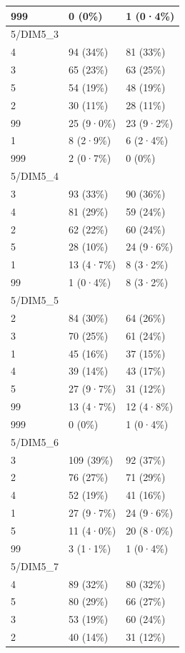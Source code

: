 \documentclass[
]{book}
\begin{document}
\begin{tabular}{l|l|l}
\hline
999 & 0 (0\%) & 1 (0·4\%)\\
\hline
5/DIM5\_3 &  & \\
\hline
4 & 94 (34\%) & 81 (33\%)\\
\hline
3 & 65 (23\%) & 63 (25\%)\\
\hline
5 & 54 (19\%) & 48 (19\%)\\
\hline
2 & 30 (11\%) & 28 (11\%)\\
\hline
99 & 25 (9·0\%) & 23 (9·2\%)\\
\hline
1 & 8 (2·9\%) & 6 (2·4\%)\\
\hline
999 & 2 (0·7\%) & 0 (0\%)\\
\hline
5/DIM5\_4 &  & \\
\hline
3 & 93 (33\%) & 90 (36\%)\\
\hline
4 & 81 (29\%) & 59 (24\%)\\
\hline
2 & 62 (22\%) & 60 (24\%)\\
\hline
5 & 28 (10\%) & 24 (9·6\%)\\
\hline
1 & 13 (4·7\%) & 8 (3·2\%)\\
\hline
99 & 1 (0·4\%) & 8 (3·2\%)\\
\hline
5/DIM5\_5 &  & \\
\hline
2 & 84 (30\%) & 64 (26\%)\\
\hline
3 & 70 (25\%) & 61 (24\%)\\
\hline
1 & 45 (16\%) & 37 (15\%)\\
\hline
4 & 39 (14\%) & 43 (17\%)\\
\hline
5 & 27 (9·7\%) & 31 (12\%)\\
\hline
99 & 13 (4·7\%) & 12 (4·8\%)\\
\hline
999 & 0 (0\%) & 1 (0·4\%)\\
\hline
5/DIM5\_6 &  & \\
\hline
3 & 109 (39\%) & 92 (37\%)\\
\hline
2 & 76 (27\%) & 71 (29\%)\\
\hline
4 & 52 (19\%) & 41 (16\%)\\
\hline
1 & 27 (9·7\%) & 24 (9·6\%)\\
\hline
5 & 11 (4·0\%) & 20 (8·0\%)\\
\hline
99 & 3 (1·1\%) & 1 (0·4\%)\\
\hline
5/DIM5\_7 &  & \\
\hline
4 & 89 (32\%) & 80 (32\%)\\
\hline
5 & 80 (29\%) & 66 (27\%)\\
\hline
3 & 53 (19\%) & 60 (24\%)\\
\hline
2 & 40 (14\%) & 31 (12\%)\\

\end{tabular}
\end{document}
